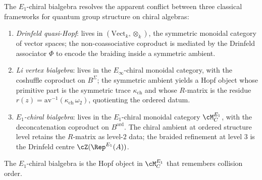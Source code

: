 \begin{remark}
\label{rem:three-way-resolution}
The $E_1$-chiral bialgebra resolves the apparent conflict between
three classical frameworks for quantum group structure on chiral algebras:
\begin{enumerate}[label=(\alph*)]
 \item \emph{Drinfeld quasi-Hopf}: lives in $(\mathrm{Vect}_k, \otimes_k)$,
 the symmetric monoidal category of vector spaces; the non-coassociative
 coproduct is mediated by the Drinfeld associator $\Phi$ to encode the
 braiding inside a symmetric ambient.
 \item \emph{Li vertex bialgebra}: lives in the $E_\infty$-chiral
 monoidal category, with the coshuffle coproduct on $B^{\Sigma}$;
 the symmetric ambient yields a Hopf object whose primitive part is
 the symmetric trace $\kappa_{\mathrm{ch}}$ and whose $R$-matrix is
 the residue $r(z) = \mathrm{av}^{-1}(\kappa_{\mathrm{ch}}\,\omega_2)$,
 quotienting the ordered datum.
 \item \emph{$E_1$-chiral bialgebra}: lives in the $E_1$-chiral monoidal
 category $\cM^{E_1}_C$, with the deconcatenation coproduct on
 $B^{\mathrm{ord}}$. The chiral ambient at ordered structure level
 retains the $R$-matrix as level-$2$ data; the braided refinement at
 level $3$ is the Drinfeld centre $\cZ(\Rep^{E_1}(A))$.
\end{enumerate}
The $E_1$-chiral bialgebra is the Hopf object in $\cM^{E_1}_C$ that
remembers collision order.
\end{remark}


